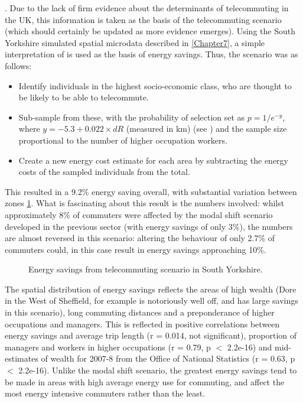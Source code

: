 \citep[p.~336]{Helminen2007}. Due to the lack of firm evidence about the
determinants of telecommuting in the UK, this information is taken as the
basis of the telecommuting scenario (which should certainly be updated
as more evidence emerges). Using the South Yorkshire simulated spatial microdata
described in \cref{Chapter7}, a simple interpretation of
\citet{Helminen2007} is used as the basis of energy savings. Thus, the scenario
was as follows:
\begin{itemize}
 \item Identify individuals in the highest socio-economic class, who are thought
 to be likely to be able to telecommute.
 \item Sub-sample from these, with the probability of selection set as
 $p = 1/e^{-y}$, where $y = −5.3 + 0.022 \times dR$ (measured in km) (see
 \citealp{Helminen2007}) and the sample size proportional to the number of
 higher occupation workers.
 \item Create a new energy cost estimate for each area by subtracting the
 energy costs of the sampled individuals from the total.
\end{itemize}
This resulted in a 9.2\% energy saving overall, with substantial variation between
zones \cref{ftelesave}. What is fascinating about this result is the numbers
involved: whilst approximately 8\% of commuters were affected by the
modal shift scenario developed in the previous sector (with energy savings
of only 3\%), the numbers are almost reversed in this scenario: altering the
behaviour of only 2.7\% of commuters could, in this case result in energy
savings approaching 10\%.

\begin{figure}
 \caption{Energy savings from telecommuting scenario in South Yorkshire.}
 \label{ftelesave}
\end{figure}

The spatial distribution of energy savings reflects the areas of high wealth
(Dore in the West of Sheffield, for example is notoriously well off, and has large savings
in this scenario), long commuting distances and a preponderance of higher occupations
and managers. This is reflected in positive correlations between energy savings
and average trip length (r = 0.014, not significant), proportion of managers
and workers in higher occupations (r = 0.79, p $<$ 2.2e-16) and
mid-estimates of wealth for 2007-8 from the Office of National Statistics
(r = 0.63, p $<$ 2.2e-16). Unlike the modal shift scenario, the
greatest energy savings tend to be made in areas with high average energy
use for commuting, and affect the most energy intensive commuters rather than
the least.

